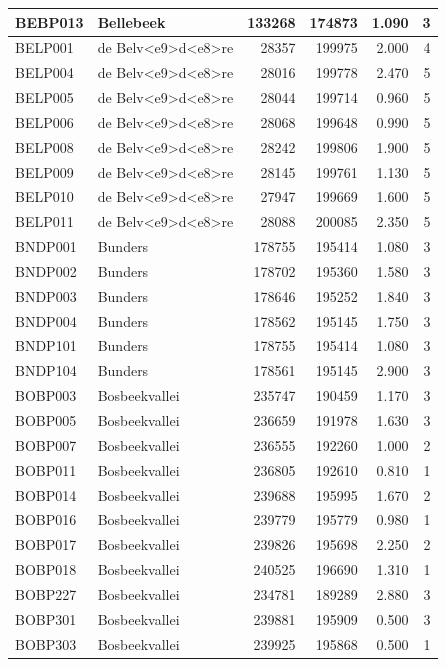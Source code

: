 \documentclass[11pt,]{book}
\begin{document}
\begin{table}
\begin{tabular}[t]{l|l|r|r|r|r}
\hline
BEBP013 & Bellebeek & 133268 & 174873 & 1.090 & 3\\
\hline
BELP001 & de Belv<e9>d<e8>re & 28357 & 199975 & 2.000 & 4\\
\hline
BELP004 & de Belv<e9>d<e8>re & 28016 & 199778 & 2.470 & 5\\
\hline
BELP005 & de Belv<e9>d<e8>re & 28044 & 199714 & 0.960 & 5\\
\hline
BELP006 & de Belv<e9>d<e8>re & 28068 & 199648 & 0.990 & 5\\
\hline
BELP008 & de Belv<e9>d<e8>re & 28242 & 199806 & 1.900 & 5\\
\hline
BELP009 & de Belv<e9>d<e8>re & 28145 & 199761 & 1.130 & 5\\
\hline
BELP010 & de Belv<e9>d<e8>re & 27947 & 199669 & 1.600 & 5\\
\hline
BELP011 & de Belv<e9>d<e8>re & 28088 & 200085 & 2.350 & 5\\
\hline
BNDP001 & Bunders & 178755 & 195414 & 1.080 & 3\\
\hline
BNDP002 & Bunders & 178702 & 195360 & 1.580 & 3\\
\hline
BNDP003 & Bunders & 178646 & 195252 & 1.840 & 3\\
\hline
BNDP004 & Bunders & 178562 & 195145 & 1.750 & 3\\
\hline
BNDP101 & Bunders & 178755 & 195414 & 1.080 & 3\\
\hline
BNDP104 & Bunders & 178561 & 195145 & 2.900 & 3\\
\hline
BOBP003 & Bosbeekvallei & 235747 & 190459 & 1.170 & 3\\
\hline
BOBP005 & Bosbeekvallei & 236659 & 191978 & 1.630 & 3\\
\hline
BOBP007 & Bosbeekvallei & 236555 & 192260 & 1.000 & 2\\
\hline
BOBP011 & Bosbeekvallei & 236805 & 192610 & 0.810 & 1\\
\hline
BOBP014 & Bosbeekvallei & 239688 & 195995 & 1.670 & 2\\
\hline
BOBP016 & Bosbeekvallei & 239779 & 195779 & 0.980 & 1\\
\hline
BOBP017 & Bosbeekvallei & 239826 & 195698 & 2.250 & 2\\
\hline
BOBP018 & Bosbeekvallei & 240525 & 196690 & 1.310 & 1\\
\hline
BOBP227 & Bosbeekvallei & 234781 & 189289 & 2.880 & 3\\
\hline
BOBP301 & Bosbeekvallei & 239881 & 195909 & 0.500 & 3\\
\hline
BOBP303 & Bosbeekvallei & 239925 & 195868 & 0.500 & 1\\

\end{tabular}
\end{table}
\end{document}
